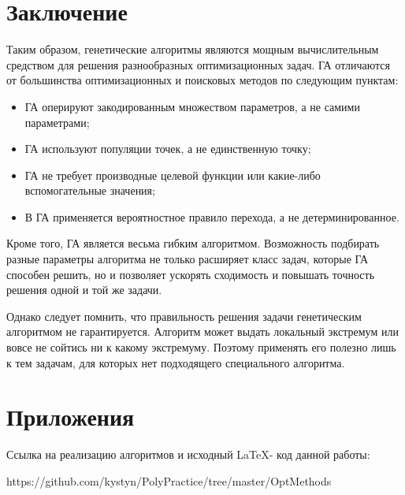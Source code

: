 \chapter{Заключение}
Таким образом, генетические алгоритмы являются мощным вычислительным средством для решения разнообразных оптимизационных задач. ГА отличаются от большинства оптимизационных и поисковых методов по следующим пунктам:
\begin{itemize}
	\item ГА оперируют закодированным множеством параметров, а не самими параметрами;
	\item ГА используют популяции точек, а не единственную точку;
	\item ГА не требует производные целевой функции или какие-либо вспомогательные значения;
	\item В ГА применяется вероятностное правило перехода, а не детерминированное.
\end{itemize}

Кроме того, ГА является весьма гибким алгоритмом. Возможность подбирать разные параметры алгоритма не только расширяет класс задач, которые ГА способен решить, но и позволяет ускорять сходимость и повышать точность решения одной и той же задачи.

Однако следует помнить, что правильность решения задачи генетическим алгоритмом не гарантируется. Алгоритм может выдать локальный экстремум или вовсе не сойтись ни к какому экстремуму. Поэтому применять его полезно лишь к тем задачам, для которых нет подходящего специального алгоритма.

\chapter*{Приложения}

Ссылка на реализацию алгоритмов и исходный \LaTeX - код данной работы: 

https://github.com/kystyn/PolyPractice/tree/master/OptMethods

\printbibliography
{}

